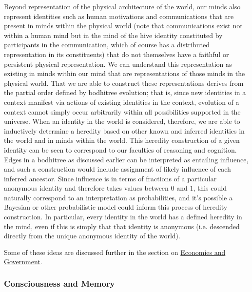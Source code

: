 \documentclass[pra,twocolumn,groupedaddress,10pt]{revtex4}
\theoremstyle{definition}
\begin{document}
Beyond representation of the physical architecture of the world, our minds also represent identities such as human motivations and communications that are present in minds within the physical world (note that communications exist not within a human mind but in the mind of the hive identity constituted by participants in the communication, which of course has a distributed representation in its constituents) that do not themselves have a faithful or persistent physical representation. We can understand this representation as existing in minds within our mind that are representations of those minds in the physical world. That we are able to construct these representations derives from the partial order defined by bodhitree evolution; that is, since new identities in a context manifest via actions of existing identities in the context, evolution of a context cannot simply occur arbitrarily within all possibilities supported in the universe. When an identity in the world is considered, therefore, we are able to inductively determine a heredity based on other known and inferred identities in the world and in minds within the world. This heredity construction of a given identity can be seen to correspond to our faculties of reasoning and cognition. Edges in a bodhitree as discussed earlier can be interpreted as entailing influence, and such a construction would include assignment of likely influence of each inferred ancestor. Since influence is in terms of fractions of a particular anonymous identity and therefore takes values between $0$ and $1$, this could naturally correspond to an interpretation as probabilities, and it's possible a Bayesian or other probabilistic model could inform this process of heredity construction. In particular, every identity in the world has a defined heredity in the mind, even if this is simply that that identity is anonymous (i.e. descended directly from the unique anonymous identity of the world).

Some of these ideas are discussed further in the section on \hyperref[sec:ecogovintpro]{Economies and Government}.

\subsubsection{Consciousness and Memory} \label{sec:memory}
\end{document}
